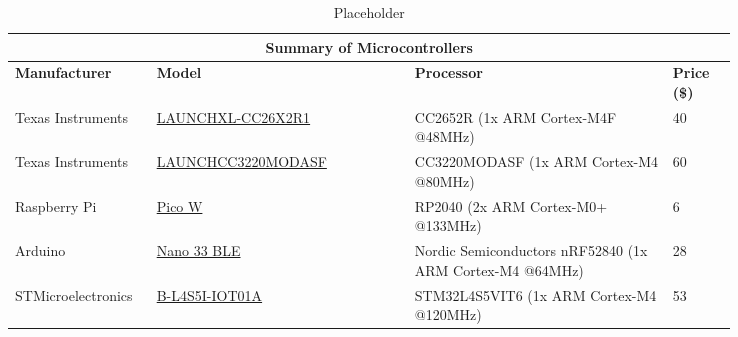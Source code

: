 \begin{table}[]
    \centering
    \begin{tabular}{|p{0.12\linewidth}|p{0.32\linewidth}|p{0.32\linewidth}|p{0.08\linewidth}|}
    \hline
    \multicolumn{4}{|c|}{\textbf{Summary of Microcontrollers}}                                                    \\ \hline
    \textbf{Manu\-facturer} & \textbf{Model}                                                                                & \textbf{Processor}                                        & \textbf{Price (\$)} \\ \hline
    Texas Instruments       & \href{https://www.ti.com/tool/LAUNCHXL-CC26X2R1}{LAUNCHXL-CC26X2R1}                           & CC2652R (1x ARM Cortex-M4F @48MHz)                        & 40    \\ \hline
    Texas Instruments       & \href{https://www.ti.com/tool/LAUNCHCC3220MODASF}{LAUNCHCC3220MODASF}                         & CC3220MODASF (1x ARM Cortex-M4 @80MHz)                    & 60    \\ \hline
    Raspberry Pi            & \href{https://www.raspberrypi.com/products/raspberry-pi-pico/}{Pico W}                        & RP2040 (2x ARM Cortex-M0+ @133MHz)                        & 6     \\ \hline
    Arduino                 & \href{https://store-usa.arduino.cc/products/arduino-nano-33-ble?selectedStore=u}{Nano 33 BLE} & Nordic Semiconductors nRF52840 (1x ARM Cortex-M4 @64MHz)  & 28    \\ \hline
    STMicro\-electronics    & \href{https://www.st.com/en/evaluation-tools/b-l4s5i-iot01a.html}{B-L4S5I-IOT01A}             & STM32L4S5VIT6 (1x ARM Cortex-M4 @120MHz)                  & 53    \\ \hline
    \end{tabular}
    \caption{Placeholder}
    \label{tab:my-table} 
\end{table}
